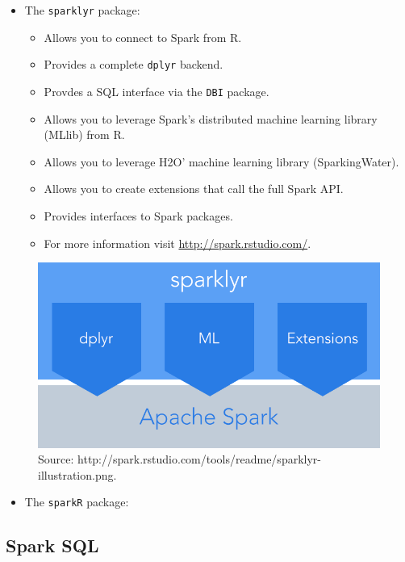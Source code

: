 \documentclass[]{book}
\providecommand{\tightlist}{%
  \setlength{\itemsep}{0pt}\setlength{\parskip}{0pt}}
\theoremstyle{definition}
\theoremstyle{definition}
\theoremstyle{definition}
\theoremstyle{remark}
\begin{document}
\begin{itemize}
\item
  The \texttt{sparklyr} package:

  \begin{itemize}
  \item
    Allows you to connect to Spark from R.
  \item
    Provides a complete \texttt{dplyr} backend.
  \item
    Provdes a SQL interface via the \texttt{DBI} package.
  \item
    Allows you to leverage Spark's distributed machine learning library
    (MLlib) from R.
  \item
    Allows you to leverage H2O' machine learning library
    (SparkingWater).
  \item
    Allows you to create extensions that call the full Spark API.
  \item
    Provides interfaces to Spark packages.
  \item
    For more information visit \url{http://spark.rstudio.com/}.
  \end{itemize}
\end{itemize}

\begin{figure}

\includegraphics[width=0.7\linewidth]{illustrations/sparklyr-illustration} \hfill{}

\caption{Source: http://spark.rstudio.com/tools/readme/sparklyr-illustration.png.}\label{fig:sparklyr-illustration}
\end{figure}

\begin{itemize}
\tightlist
\item
  The \texttt{sparkR} package:
\end{itemize}

\hypertarget{spark-sql}{%
\subsection{Spark SQL}\label{spark-sql}}
\end{document}
